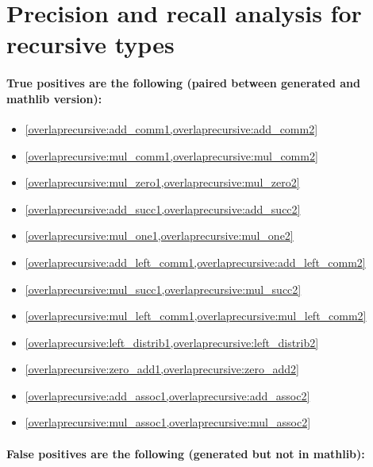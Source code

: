 \section{Precision and recall analysis for recursive types}\label{app:overlaprecursive}

\vspace{-0.5cm}
\paragraph*{True positives are the following (paired between generated and mathlib version):}

\begin{multicols}{2}
\begin{itemize}[noitemsep]
    \item \cref{overlaprecursive:add_comm1,overlaprecursive:add_comm2}
    \item \cref{overlaprecursive:mul_comm1,overlaprecursive:mul_comm2}
    \item \cref{overlaprecursive:mul_zero1,overlaprecursive:mul_zero2}
    \item \cref{overlaprecursive:add_succ1,overlaprecursive:add_succ2}
    \item \cref{overlaprecursive:mul_one1,overlaprecursive:mul_one2}
    \item \cref{overlaprecursive:add_left_comm1,overlaprecursive:add_left_comm2}
    \item \cref{overlaprecursive:mul_succ1,overlaprecursive:mul_succ2}
    \item \cref{overlaprecursive:mul_left_comm1,overlaprecursive:mul_left_comm2}
    \item \cref{overlaprecursive:left_distrib1,overlaprecursive:left_distrib2}
    \item \cref{overlaprecursive:zero_add1,overlaprecursive:zero_add2}
    \item \cref{overlaprecursive:add_assoc1,overlaprecursive:add_assoc2}
    \item \cref{overlaprecursive:mul_assoc1,overlaprecursive:mul_assoc2}
\end{itemize}
\end{multicols}

\vspace{-0.6cm}
\paragraph*{False positives are the following (generated but not in mathlib):}

